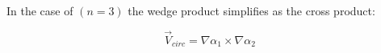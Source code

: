 \documentclass[conf]{new-aiaa}
\begin{document}
\noindent
In the case of $(n=3)$ the wedge product simplifies as the cross product:

\begin{equation}
\overrightarrow{V}_{circ} =  \nabla\alpha_1 \times \nabla\alpha_2 
\label{circOnlySimp}
\end{equation}

%
%
%



%





\end{document}
